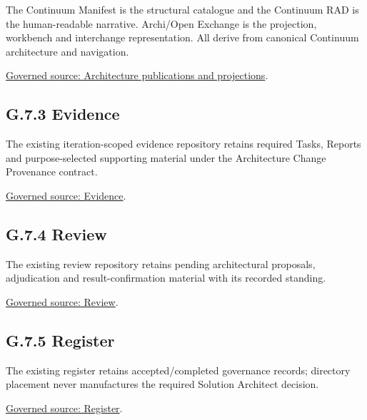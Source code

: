 The Continuum Manifest is the structural catalogue and the Continuum RAD is the human-readable narrative. Archi/Open Exchange is the projection, workbench and interchange representation. All derive from canonical Continuum architecture and navigation.\par
\href{../../../../../../../documentation/README.md}{Governed source: Architecture publications and projections}.\par
\subsection*{G.7.3 Evidence}
\label{navigation:G.7.3}

The existing iteration-scoped evidence repository retains required Tasks, Reports and purpose-selected supporting material under the Architecture Change Provenance contract.\par
\href{../../../../..}{Governed source: Evidence}.\par
\subsection*{G.7.4 Review}
\label{navigation:G.7.4}

The existing review repository retains pending architectural proposals, adjudication and result-confirmation material with its recorded standing.\par
\href{../../../../../../review}{Governed source: Review}.\par
\subsection*{G.7.5 Register}
\label{navigation:G.7.5}

The existing register retains accepted/completed governance records; directory placement never manufactures the required Solution Architect decision.\par
\href{../../../../../../register}{Governed source: Register}.\par
